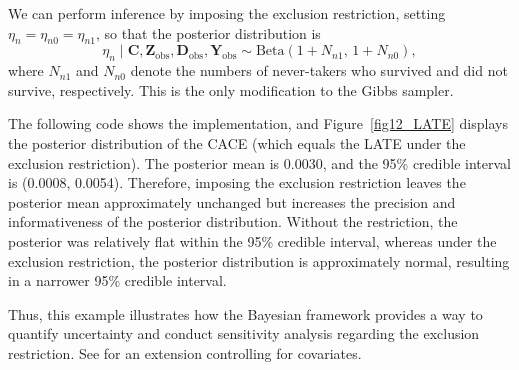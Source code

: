 We can perform inference by imposing the exclusion restriction, setting $\eta_{n} = \eta_{n0} = \eta_{n1}$, so that the posterior distribution is
\[
\eta_{n} \mid \mathbf{C}, \mathbf{Z}_{\text{obs}}, \mathbf{D}_{\text{obs}}, \mathbf{Y}_{\text{obs}} \sim \text{Beta}(1 + N_{n1},\, 1 + N_{n0}),
\]
where $N_{n1}$ and $N_{n0}$ denote the numbers of never-takers who survived and did not survive, respectively. This is the only modification to the Gibbs sampler.  

The following code shows the implementation, and Figure~\ref{fig12_LATE} displays the posterior distribution of the CACE (which equals the LATE under the exclusion restriction). The posterior mean is 0.0030, and the 95\% credible interval is (0.0008, 0.0054). Therefore, imposing the exclusion restriction leaves the posterior mean approximately unchanged but increases the precision and informativeness of the posterior distribution. Without the restriction, the posterior was relatively flat within the 95\% credible interval, whereas under the exclusion restriction, the posterior distribution is approximately normal, resulting in a narrower 95\% credible interval.

Thus, this example illustrates how the Bayesian framework provides a way to quantify uncertainty and conduct sensitivity analysis regarding the exclusion restriction. See \cite{hirano2000assessing} for an extension controlling for covariates.\\

